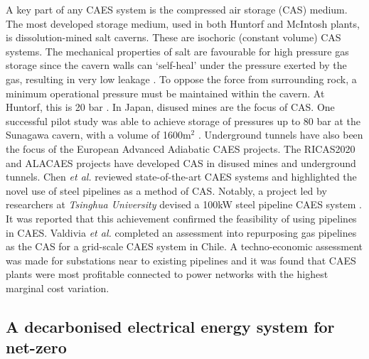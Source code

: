\documentclass[preprint,12pt]{elsarticle}
\begin{document}
A key part of any CAES system is the compressed air storage (CAS) medium. The most developed storage medium, used in both Huntorf and McIntosh plants, is dissolution-mined salt caverns. These are isochoric (constant volume) CAS systems. The mechanical properties of salt are favourable for high pressure gas storage since the cavern walls can ‘self-heal’ under the pressure exerted by the gas, resulting in very low leakage \cite{Allen1982}. To oppose the force from surrounding rock, a minimum operational pressure must be maintained within the cavern. At Huntorf, this is 20 bar \cite{Crotogino2001}. In Japan, disused mines are the focus of CAS. One successful pilot study was able to achieve storage of pressures up to 80 bar at the Sunagawa cavern, with a volume of 1600m$^2$ \cite{Chen2016}. Underground tunnels have also been the focus of the European Advanced Adiabatic CAES projects. The RICAS2020 \cite{RICAS2020} and ALACAES \cite{Geissbuhler2018} projects have developed CAS in disused mines and underground tunnels. Chen \textit{et al.} \cite{Chen2016} reviewed state-of-the-art CAES systems and highlighted the novel use of steel pipelines as a method of CAS. Notably, a project led by researchers at \textit{Tsinghua University} devised a 100kW steel pipeline CAES system \cite{Chen2016}. It was reported that this achievement confirmed the feasibility of using pipelines in CAES. Valdivia \textit{et al.} \cite{Valdivia2020} completed an assessment into repurposing gas pipelines as the CAS for a grid-scale CAES system in Chile. A techno-economic assessment was made for substations near to existing pipelines and it was found that CAES plants were most profitable connected to power networks with the highest marginal cost variation.


\subsection{A decarbonised electrical energy system for net-zero}
\label{sec:decarb}

\end{document}
